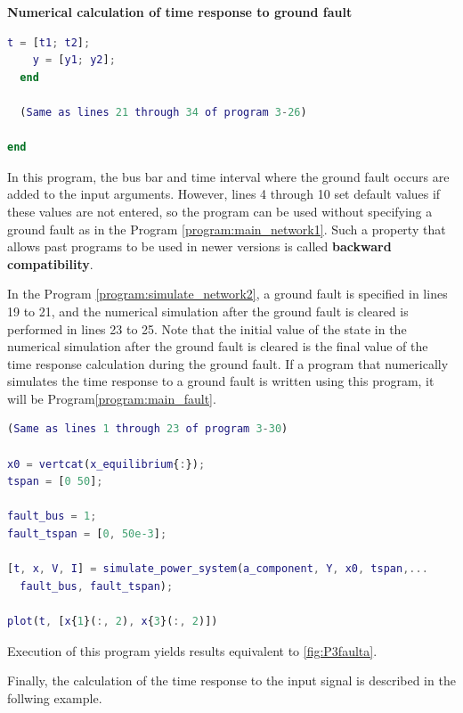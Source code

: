 \documentclass[graybox, envcountchap]{svmult}
\begin{document}
\begin{example}{\textbf{Numerical calculation of time response to ground fault}}
\begin{lstlisting}[language=Matlab, caption=simulate\_power\_system.m, label={program:simulate_network2}]
    t = [t1; t2];
    y = [y1; y2];
  end

  (Same as lines 21 through 34 of program 3-26)

end
\end{lstlisting}

In this program, the bus bar and time interval where the ground fault occurs are
added to the input arguments. However, lines 4 through 10 set default values if
these values are not entered, so the program can be used without specifying a
ground fault as in the Program \nobreak\ref{program:main_network1}. Such a
property that allows past programs to be used in newer versions is called
\textbf{backward compatibility}.

In the Program \nobreak\ref{program:simulate_network2}, a ground fault is
specified in lines 19 to 21, and the numerical simulation after the ground fault
is cleared is performed in lines 23 to 25. Note that the initial value of the
state in the numerical simulation after the ground fault is cleared is the final
value of the time response calculation during the ground fault. If a program
that numerically simulates the time response to a ground fault is written using
this program, it will be Program\nobreak\ref{program:main_fault}.


\begin{lstlisting}[language=Matlab, caption=main\_simulation\_3bus\_fault.m, label={program:main_fault}]
(Same as lines 1 through 23 of program 3-30)

x0 = vertcat(x_equilibrium{:});
tspan = [0 50];

fault_bus = 1;
fault_tspan = [0, 50e-3];

[t, x, V, I] = simulate_power_system(a_component, Y, x0, tspan,...
  fault_bus, fault_tspan);

plot(t, [x{1}(:, 2), x{3}(:, 2)])
\end{lstlisting}

Execution of this program yields results equivalent to \ref{fig:P3faulta}.
\end{example}

Finally, the calculation of the time response to the input signal is described
in the follwing example.
\end{document}
